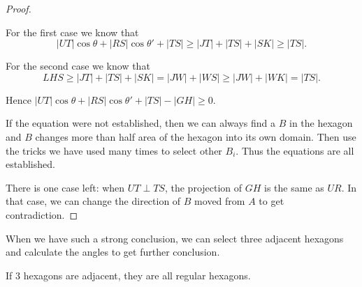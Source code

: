 \begin{proof}
\begin{center}
	\end{center}
	
	For the first case we know that 
	\[ |UT|\cos\theta+|RS|\cos\theta' + |TS| \geq |JT| + |TS| + |SK|
	\geq|TS|. \]
	
	For the second case we know that
	\[ LHS\geq|JT| + |TS| + |SK| = |JW| + |WS|\geq |JW| + 
	|WK| = |TS|. \]
	
	Hence $|UT|\cos\theta+|RS|\cos\theta'+|TS|-|GH|\geq 0$.
	
	If the equation were not established, then we can always find a $B$ 
	in the hexagon and $B$ changes more than half area of the hexagon 
	into its own domain. Then use the tricks we have used many 
	times to select other $B_i$. 
	Thus the equations are all established.
	
	There is one case left: when $UT\perp TS$, the projection of $GH$ 
	is the same as $UR$. In that case, we can change the direction of $B$ 
	moved from $A$ to get contradiction. 
\end{proof}

When we have such a strong conclusion, we can select three adjacent 
hexagons and calculate the angles to get further conclusion.

\begin{thm}
	If 3 hexagons are adjacent, they are all regular hexagons.
\end{thm}

